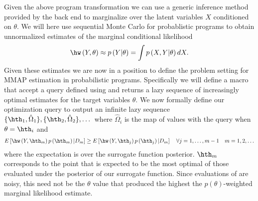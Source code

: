 



Given the above program transformation we can use a generic inference method provided by the back end to marginalize over the latent variables $X$ conditioned on $\theta$. We will here use sequential Monte Carlo for probablistic programs \citep{wood2014new} to obtain unnormalized estimates of the marginal conditional likelihood
\begin{align}
\hw \left(Y,\theta\right) \approx p\left(Y | \theta\right) =\int p\left(X,Y|\theta\right) dX.
\end{align}
Given these estimates we are now in a position to define the problem setting for MMAP estimation in probabilistic programs. Specifically we will define a macro  that accept a query defined using  and returns a lazy sequence of increasingly optimal estimates for the target variables $\theta$. We now formally define our optimization query to output an infinite lazy sequence $\{\hth_1,\hat{\Omega}_1\},\{\hth_2,\hat{\Omega}_2\},\dots$ where $\hat{\Omega}_i$ is the map of \predict values with the query when $\theta=\hth_i$ and
\begin{align}
\label{eq:BOPPoutput}
E\left[\hw \left(Y,\hth_m\right) p\left(\hth_m\right) | D_{m} \right] \ge E\left[\hw \left(Y,\hth_j\right) p\left(\hth_j\right) | D_{m} \right] \quad \forall j=1,\dots,m-1 \quad m=1,2,\dots
\end{align}
where the expectation is over the surrogate function posterior. $\hth_m$ corresponds to the point that is expected to be the most optimal of those evaluated under the posterior of our surrogate function. Since evaluations of are noisy, this need not be the $\theta$ value that produced the highest the $p(\theta)$-weighted marginal likelihood estimate. %


